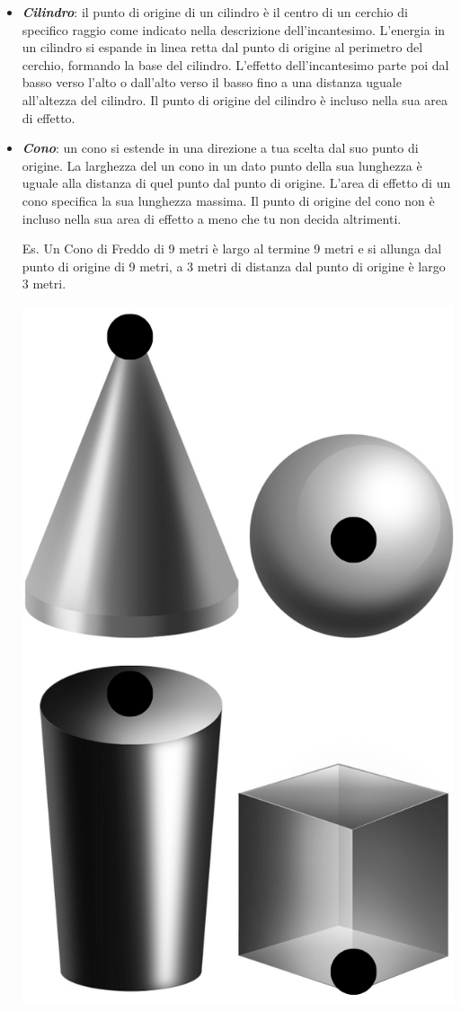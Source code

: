 \begin{multicols}{2}
\begin{itemize}[leftmargin=*] \setlength{\itemsep}{0pt}
\item \emph{\textbf{Cilindro}}: il punto di origine di un cilindro è il centro di un cerchio di specifico raggio come indicato nella descrizione dell'incantesimo. L'energia in un cilindro si espande in linea retta dal punto di origine al perimetro del cerchio, formando la base del cilindro. L'effetto dell'incantesimo parte poi dal basso verso l'alto o dall'alto verso il basso fino a una distanza uguale all'altezza del cilindro. Il punto di origine del cilindro è incluso nella sua area di effetto.

\item \emph{\textbf{Cono}}: un cono si estende in una direzione a tua scelta dal suo punto di origine. La larghezza del un cono in un dato punto della sua lunghezza è uguale alla distanza di quel punto dal punto di origine. L'area di effetto di un cono specifica la sua lunghezza massima. Il punto di origine del cono non è incluso nella sua area di effetto a meno che tu non decida altrimenti.

Es. Un Cono di Freddo di 9 metri è largo al termine 9 metri e si allunga dal punto di origine di 9 metri, a 3 metri di distanza dal punto di origine è largo 3 metri.

\begin{center}
	\includegraphics[width=0.7\linewidth]{immagini/3dformev2.png}


\end{center}
\end{itemize}
\end{multicols}
